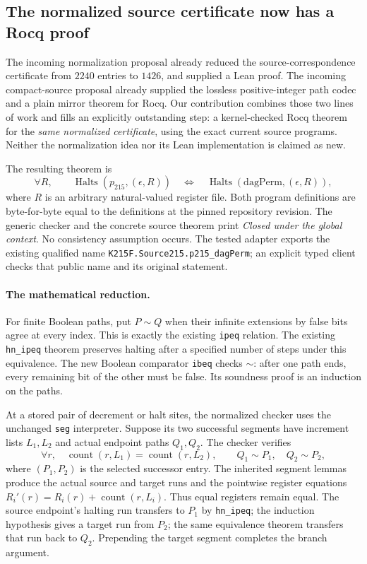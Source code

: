 \subsection{The normalized source certificate now has a Rocq proof}

The incoming normalization proposal already reduced the source-correspondence
certificate from $2240$ entries to $1426$, and supplied a Lean proof. The incoming
compact-source proposal already supplied the lossless positive-integer path codec
and a plain mirror theorem for Rocq. Our contribution combines those two lines of
work and fills an explicitly outstanding step: a kernel-checked Rocq theorem for
the \emph{same normalized certificate}, using the exact current source programs.
Neither the normalization idea nor its Lean implementation is claimed as new.

The resulting theorem is
\[
 \forall R,\qquad
 \operatorname{Halts}(p_{215},(\epsilon,R))
 \quad\Longleftrightarrow\quad
 \operatorname{Halts}(\mathrm{dagPerm},(\epsilon,R)),
\]
where $R$ is an arbitrary natural-valued register file. Both program definitions
are byte-for-byte equal to the definitions at the pinned repository revision.
The generic checker and the concrete source theorem print
\emph{Closed under the global context}. No consistency assumption occurs.
The tested adapter exports the existing qualified name
\texttt{K215F.Source215.p215\_dagPerm}; an explicit typed client checks that public
name and its original statement.

\paragraph{The mathematical reduction.}
For finite Boolean paths, put $P\sim Q$ when their infinite extensions by false
bits agree at every index. This is exactly the existing \texttt{ipeq} relation.
The existing \texttt{hn\_ipeq} theorem preserves halting after a specified number
of steps under this equivalence. The new Boolean comparator \texttt{ibeq} checks
$\sim$: after one path ends, every remaining bit of the other must be false.
Its soundness proof is an induction on the paths.

At a stored pair of decrement or halt sites, the normalized checker uses the
unchanged \texttt{seg} interpreter. Suppose its two successful segments have
increment lists $L_1,L_2$ and actual endpoint paths $Q_1,Q_2$. The checker verifies
\[
 \forall r,\quad \operatorname{count}(r,L_1)=\operatorname{count}(r,L_2),
 \qquad Q_1\sim P_1,\quad Q_2\sim P_2,
\]
where $(P_1,P_2)$ is the selected successor entry. The inherited segment lemmas
produce the actual source and target runs and the pointwise register equations
$R_i'(r)=R_i(r)+\operatorname{count}(r,L_i)$. Thus equal registers remain equal.
The source endpoint's halting run transfers to $P_1$ by \texttt{hn\_ipeq}; the
induction hypothesis gives a target run from $P_2$; the same equivalence theorem
transfers that run back to $Q_2$. Prepending the target segment completes the
branch argument.

